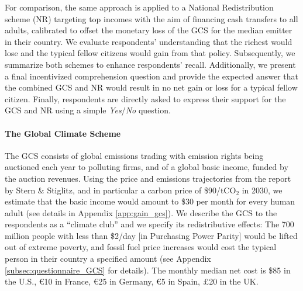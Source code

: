 \begin{bibunit}
For comparison, %
the same approach is applied to a National Redistribution scheme (NR) targeting top incomes %
with the aim of financing cash transfers to all adults, %
calibrated to offset the monetary loss of the GCS for the median emitter in their country. We evaluate respondents' understanding that the richest would lose and the typical fellow citizens would gain from that policy. %
Subsequently, we summarize both schemes to enhance respondents' recall. Additionally, we present a final incentivized comprehension question and provide the expected answer that the combined GCS and NR would result in no net gain or loss for a typical fellow citizen. Finally, respondents are directly asked to express their support for the GCS and NR using a simple \textit{Yes}/\textit{No} question.

\begin{tcolorbox}\label{box:GCS}
  \paragraph{The Global Climate Scheme} The GCS consists of global emissions trading with emission rights being auctioned each year to polluting firms, and of a global basic income, funded by the auction revenues. Using the price and emissions trajectories from the report by Stern \& Stiglitz,\cite{stern_report_2017} and in particular a carbon price of \$90/tCO$_\text{2}$ in 2030, we estimate that the basic income would amount to \$30 per month for every human adult %
  (see details in Appendix \ref{app:gain_gcs}). %
  We describe the GCS to the respondents as a ``climate club'' and we specify its redistributive effects: The 700 million people with less than \$2/day [in Purchasing Power Parity] would be lifted out of extreme poverty, and fossil fuel price increases would cost the typical person in their country a specified amount (see Appendix \ref{subsec:questionnaire_GCS} for details). The monthly median net cost is \$85 in the U.S., \euro{}10 in France, \euro{}25 in Germany, \euro{}5 in Spain, £20 in the UK.
\end{tcolorbox}


\end{bibunit}
